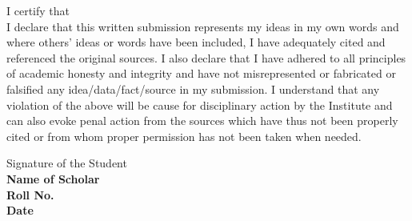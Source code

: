 I certify that \\ 

I declare that this written submission represents my ideas in my own words and where others' ideas or words have been included, I have adequately cited and referenced the original sources. I also declare that I have adhered to all principles of academic honesty and integrity and have not misrepresented or fabricated or falsified any idea/data/fact/source in my submission. I understand that any violation of the above will be cause for disciplinary action by the Institute and can also evoke penal action from the sources which have thus not been properly cited or from whom proper permission has not been taken when needed.

\vspace {10mm}
\begin{flushright}
Signature of the Student\\
\textbf{Name of Scholar}\\
\textbf{Roll No.}\\
\textbf{Date }\\
\end{flushright}
